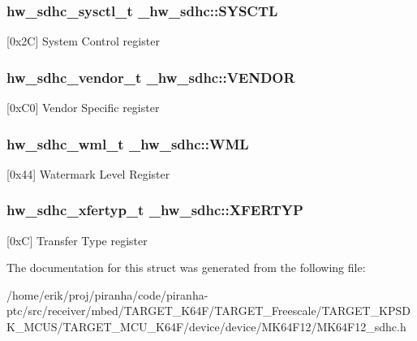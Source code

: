 \subsubsection[{\texorpdfstring{S\+Y\+S\+C\+TL}{SYSCTL}}]{ {\bf hw\+\_\+sdhc\+\_\+sysctl\+\_\+t} \+\_\+hw\+\_\+sdhc\+::\+S\+Y\+S\+C\+TL}\hypertarget{struct__hw__sdhc_a4ddc218bb5d09571192cac637ca74986}{}\label{struct__hw__sdhc_a4ddc218bb5d09571192cac637ca74986}
\mbox{[}0x2C\mbox{]} System Control register 
\subsubsection[{\texorpdfstring{V\+E\+N\+D\+OR}{VENDOR}}]{ {\bf hw\+\_\+sdhc\+\_\+vendor\+\_\+t} \+\_\+hw\+\_\+sdhc\+::\+V\+E\+N\+D\+OR}\hypertarget{struct__hw__sdhc_a22a9db48eddef86d2ea97a226b8b8c1c}{}\label{struct__hw__sdhc_a22a9db48eddef86d2ea97a226b8b8c1c}
\mbox{[}0x\+C0\mbox{]} Vendor Specific register 
\subsubsection[{\texorpdfstring{W\+ML}{WML}}]{ {\bf hw\+\_\+sdhc\+\_\+wml\+\_\+t} \+\_\+hw\+\_\+sdhc\+::\+W\+ML}\hypertarget{struct__hw__sdhc_a91e759b570086f7788f0d1c32e7fbe4e}{}\label{struct__hw__sdhc_a91e759b570086f7788f0d1c32e7fbe4e}
\mbox{[}0x44\mbox{]} Watermark Level Register 
\subsubsection[{\texorpdfstring{X\+F\+E\+R\+T\+YP}{XFERTYP}}]{ {\bf hw\+\_\+sdhc\+\_\+xfertyp\+\_\+t} \+\_\+hw\+\_\+sdhc\+::\+X\+F\+E\+R\+T\+YP}\hypertarget{struct__hw__sdhc_ab74624754fcc07680ac29f9a0b4e4809}{}\label{struct__hw__sdhc_ab74624754fcc07680ac29f9a0b4e4809}
\mbox{[}0xC\mbox{]} Transfer Type register 

The documentation for this struct was generated from the following file\+:\begin{DoxyCompactItemize}
\item 
/home/erik/proj/piranha/code/piranha-\/ptc/src/receiver/mbed/\+T\+A\+R\+G\+E\+T\+\_\+\+K64\+F/\+T\+A\+R\+G\+E\+T\+\_\+\+Freescale/\+T\+A\+R\+G\+E\+T\+\_\+\+K\+P\+S\+D\+K\+\_\+\+M\+C\+U\+S/\+T\+A\+R\+G\+E\+T\+\_\+\+M\+C\+U\+\_\+\+K64\+F/device/device/\+M\+K64\+F12/M\+K64\+F12\+\_\+sdhc.\+h\end{DoxyCompactItemize}
